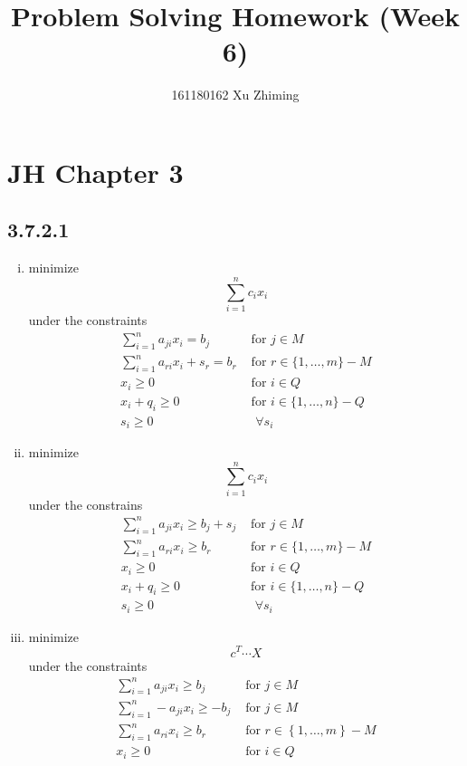 \documentclass[twocolumn, 10.5pt]{article}
\begin{document}
	\title{Problem Solving Homework (Week 6)}\author{161180162 Xu Zhiming}\maketitle
	\section*{JH Chapter 3}
	\subsection*{3.7.2.1}
	\begin{enumerate}[(i)]
		\item 
		minimize
		\[
		\sum_{i=1}^{n}c_ix_i
		\]
		under the constraints
		\[
		\begin{aligned}
			\sum_{i=1}^{n}a_{ji}x_i=b_j&\text{ for $j\in M$}\\
			\sum_{i=1}^{n}a_{ri}x_i+s_r=b_r&\text{ for $r\in\{1,\dots,m\}-M$}\\
			x_i\ge 0&\text{ for $i\in Q$}\\
			x_i+q_i\ge 0&\text{ for $i\in \{1,\dots,n\}-Q$}\\
			s_i\ge 0&\text{ $\forall s_i$}
		\end{aligned}
		\]
		\item 
		minimize
		\[
		\sum_{i=1}^{n}c_ix_i
		\]
		under the constrains
		\[
		\begin{aligned}
			\sum_{i=1}^{n}a_{ji}x_i\ge b_j+s_j&\text{ for $j\in M$}\\
			\sum_{i=1}^{n}a_{ri}x_i\ge b_r&\text{ for $r\in\{1,\dots,m\}-M$}\\
				x_i\ge 0&\text{ for $i\in Q$}\\
			x_i+q_i\ge 0&\text{ for $i\in \{1,\dots,n\}-Q$}\\
			s_i\ge 0&\text{ $\forall s_i$}
		\end{aligned}	
		\]
		\item 
		minimize
		\[
		c^T\cdots X
		\]
		under the constraints
		\[
		\begin{aligned}
			\sum_{i=1}^{n}a_{ji}x_i\ge b_j&\text{ for $j\in M$}\\
			\sum_{i=1}^{n}-a_{ji}x_i\ge -b_j&\text{ for $j\in M$}\\
			\sum_{i=1}^{n}a_{ri}x_i\ge b_r&\text{ for $r\in \left\{1,\dots,m\right\}-M$}\\
			x_i\ge 0&\text{ for $i\in Q$}
		\end{aligned}
		\]
	\end{enumerate}
\end{document}
